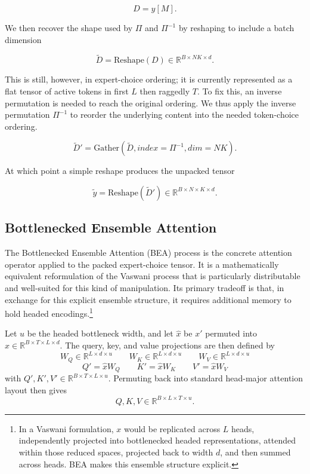 \documentclass[11pt]{article}
\begin{document}
\[
D = y[M].
\]

We then recover the shape used by $\Pi$ and $\Pi^{-1}$ by reshaping to include a batch dimension

\[
\tilde{D} = \mathrm{Reshape}(D) \in \mathbb{R}^{B \times NK \times d}.
\]

This is still, however, in expert-choice ordering; it is currently represented as a flat tensor of active tokens in first $L$ then raggedly $T$. To fix this, an inverse permutation is needed to reach the original ordering. We thus apply the inverse permutation $\Pi^{-1}$ to reorder the underlying content into the needed token-choice ordering.

\[
\tilde{D}' = \mathrm{Gather}(\tilde{D}, index=\Pi^{-1}, dim=NK).
\]

At which point a simple reshape produces the unpacked tensor

\[
\tilde{y} = \mathrm{Reshape}(\tilde{D}') \in \mathbb{R}^{B \times N \times K \times d}.
\]


\subsection{Bottlenecked Ensemble Attention}
\label{app:bea}

The Bottlenecked Ensemble Attention (BEA) process is the concrete attention operator applied to the packed expert-choice tensor. It is a mathematically equivalent reformulation of the Vaswani process that is particularly distributable and well-suited for this kind of manipulation. Its primary tradeoff is that, in exchange for this explicit ensemble structure, it requires additional memory to hold headed encodings.\footnote{In a Vaswani formulation, $x$ would be replicated across $L$ heads, independently projected into bottlenecked headed representations, attended within those reduced spaces, projected back to width $d$, and then summed across heads. BEA makes this ensemble structure explicit.}


Let $u$ be the headed bottleneck width, and let $\hat{x}$ be $x'$ permuted into $\hat{x} \in \mathbb{R}^{B \times T \times L \times d}$. The query, key, and value projections are then defined by
\[
W_Q \in \mathbb{R}^{L \times d \times u}
\qquad
W_K \in \mathbb{R}^{L \times d \times u}
\qquad
W_V \in \mathbb{R}^{L \times d \times u}
\]
\[
Q' = \hat{x} W_Q
\qquad
K' = \hat{x} W_K
\qquad
V' = \hat{x} W_V
\]
with $Q', K', V' \in \mathbb{R}^{B \times T \times L \times u}$. Permuting back into standard head-major attention layout then gives
\[
Q, K, V \in \mathbb{R}^{B \times L \times T \times u}.
\]
\end{document}
